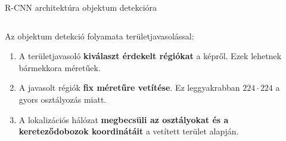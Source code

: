 \documentclass[english, aspectratio=169]{beamer}
\begin{document}
\begin{frame}{R-CNN architektúra objektum detekcióra}
\begin{columns}
\begin{column}{.4\textwidth}
Az objektum detekció folyamata területjavasolással:
\begin{enumerate}
	\item A területjavasoló \textbf{kiválaszt érdekelt régiókat} a képről. Ezek lehetnek bármekkora méretűek.
	\item A javasolt régiók \textbf{fix méretűre vetítése}. Ez leggyakrabban $224 \cdot 224$ a gyors osztályozás miatt. 
	\item A lokalizációs hálózat \textbf{megbecsüli az osztályokat és a kereteződobozok koordinátáit} a vetített terület alapján.
\end{enumerate}
\end{column}
\begin{column}{.6\textwidth}
\begin{center}
\end{center}
\end{column}
\end{columns}
\end{frame}
\end{document}

